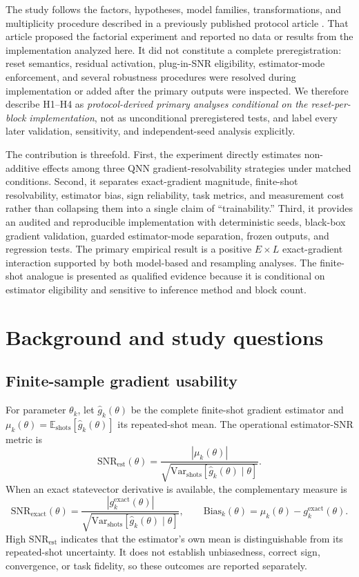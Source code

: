 \documentclass[pdflatex,sn-basic,Numbered]{sn-jnl}
\newcommand{\snrest}{\mathrm{SNR}_{\mathrm{est}}}
\newcommand{\snrexact}{\mathrm{SNR}_{\mathrm{exact}}}
\newcommand{\vshots}{\mathrm{Var}_{\mathrm{shots}}}
\begin{document}
The study follows the factors, hypotheses, model families, transformations, and multiplicity procedure described in a previously published protocol article \cite{shen2026gradient}. That article proposed the factorial experiment and reported no data or results from the implementation analyzed here. It did not constitute a complete preregistration: reset semantics, residual activation, plug-in-SNR eligibility, estimator-mode enforcement, and several robustness procedures were resolved during implementation or added after the primary outputs were inspected. We therefore describe H1--H4 as \emph{protocol-derived primary analyses conditional on the reset-per-block implementation}, not as unconditional preregistered tests, and label every later validation, sensitivity, and independent-seed analysis explicitly.

The contribution is threefold. First, the experiment directly estimates non-additive effects among three QNN gradient-resolvability strategies under matched conditions. Second, it separates exact-gradient magnitude, finite-shot resolvability, estimator bias, sign reliability, task metrics, and measurement cost rather than collapsing them into a single claim of ``trainability.'' Third, it provides an audited and reproducible implementation with deterministic seeds, black-box gradient validation, guarded estimator-mode separation, frozen outputs, and regression tests. The primary empirical result is a positive $E\times L$ exact-gradient interaction supported by both model-based and resampling analyses. The finite-shot analogue is presented as qualified evidence because it is conditional on estimator eligibility and sensitive to inference method and block count.

\section{Background and study questions}

\subsection{Finite-sample gradient usability}

For parameter $\theta_k$, let $\hat g_k(\theta)$ be the complete finite-shot gradient estimator and $\mu_k(\theta)=\mathbb{E}_{\mathrm{shots}}[\hat g_k(\theta)]$ its repeated-shot mean. The operational estimator-SNR metric is
\[
\snrest(\theta)=
\frac{|\mu_k(\theta)|}
{\sqrt{\vshots[\hat g_k(\theta)\mid\theta]}}.
\]
When an exact statevector derivative is available, the complementary measure is
\[
\snrexact(\theta)=
\frac{|g_k^{\mathrm{exact}}(\theta)|}
{\sqrt{\vshots[\hat g_k(\theta)\mid\theta]}},
\qquad
\mathrm{Bias}_k(\theta)=\mu_k(\theta)-g_k^{\mathrm{exact}}(\theta).
\]
High $\snrest$ indicates that the estimator's own mean is distinguishable from its repeated-shot uncertainty. It does not establish unbiasedness, correct sign, convergence, or task fidelity, so these outcomes are reported separately.
\end{document}
